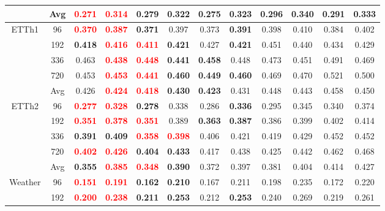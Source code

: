 \begin{table}[!htbp]
\begin{tabular}{c|c|cc|cc|cc|cc|cc}
& Avg & \textbf{\textcolor{red}{0.271}} & \textbf{\textcolor{red}{0.314}} & 0.279 & \textbf{0.322} & \textbf{0.275} & 0.323 & 0.296 & 0.340 & 0.291 & 0.333 \\
\midrule
\multirow{5}{*}{ETTh1}
& 96 & \textbf{\textcolor{red}{0.370}} & \textbf{\textcolor{red}{0.387}} & \textbf{0.371} & 0.397 & 0.373 & \textbf{0.391} & 0.398 & 0.410 & 0.384 & 0.402 \\
& 192 & \textbf{0.418} & \textbf{\textcolor{red}{0.416}} & \textbf{\textcolor{red}{0.411}} & \textbf{0.421} & 0.427 & \textbf{0.421} & 0.451 & 0.440 & 0.434 & 0.429 \\
& 336 & 0.463 & \textbf{\textcolor{red}{0.438}} & \textbf{\textcolor{red}{0.448}} & \textbf{0.441} & \textbf{0.458} & 0.448 & 0.473 & 0.451 & 0.491 & 0.469 \\
& 720 & 0.453 & \textbf{\textcolor{red}{0.453}} & \textbf{\textcolor{red}{0.441}} & \textbf{0.460} & \textbf{0.449} & \textbf{0.460} & 0.469 & 0.470 & 0.521 & 0.500 \\
& Avg & 0.426 & \textbf{\textcolor{red}{0.424}} & \textbf{\textcolor{red}{0.418}} & \textbf{0.430} & \textbf{0.423} & 0.431 & 0.448 & 0.443 & 0.458 & 0.450 \\
\midrule
\multirow{5}{*}{ETTh2}
& 96 & \textbf{\textcolor{red}{0.277}} & \textbf{\textcolor{red}{0.328}} & \textbf{0.278} & 0.338 & 0.286 & \textbf{0.336} & 0.295 & 0.345 & 0.340 & 0.374 \\
& 192 & \textbf{\textcolor{red}{0.351}} & \textbf{\textcolor{red}{0.378}} & \textbf{\textcolor{red}{0.351}} & 0.389 & \textbf{0.363} & \textbf{0.387} & 0.386 & 0.399 & 0.402 & 0.414 \\
& 336 & \textbf{0.391} & \textbf{0.409} & \textbf{\textcolor{red}{0.358}} & \textbf{\textcolor{red}{0.398}} & 0.406 & 0.421 & 0.419 & 0.429 & 0.452 & 0.452 \\
& 720 & \textbf{\textcolor{red}{0.402}} & \textbf{\textcolor{red}{0.426}} & \textbf{0.404} & \textbf{0.433} & 0.417 & 0.438 & 0.425 & 0.442 & 0.462 & 0.468 \\
& Avg & \textbf{0.355} & \textbf{\textcolor{red}{0.385}} & \textbf{\textcolor{red}{0.348}} & \textbf{0.390} & 0.372 & 0.397 & 0.381 & 0.404 & 0.414 & 0.427 \\
\midrule
\multirow{5}{*}{Weather}
& 96 & \textbf{\textcolor{red}{0.151}} & \textbf{\textcolor{red}{0.191}} & \textbf{0.162} & \textbf{0.210} & 0.167 & 0.211 & 0.198 & 0.235 & 0.172 & 0.220 \\
& 192 & \textbf{\textcolor{red}{0.200}} & \textbf{\textcolor{red}{0.238}} & \textbf{0.211} & \textbf{0.253} & 0.212 & \textbf{0.253} & 0.240 & 0.269 & 0.219 & 0.261 \\

\end{tabular}
\end{table}
